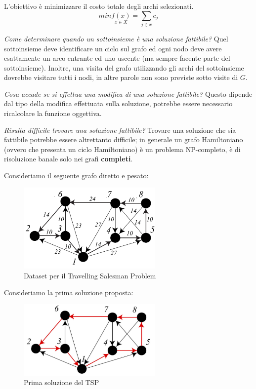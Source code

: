 \documentclass{article}
\begin{document}
L'obiettivo è minimizzare il costo totale degli archi selezionati.
$$min\underset{x\in X}{f(x)}=\sum_{j\in x}c_j$$

\textit{Come determinare quando un sottoinsieme è una soluzione fattibile?} Quel sottoinsieme deve identificare
un ciclo sul grafo ed ogni nodo deve avere esattamente un arco entrante ed uno uscente (ma sempre facente parte
del sottoinsieme). Inoltre, una visita del grafo utilizzando gli archi del sottoinsieme dovrebbe visitare tutti i
nodi, in altre parole non sono previste sotto visite di $G$.

\textit{Cosa accade se si effettua una modifica di una soluzione fattibile?} Questo dipende dal tipo della modifica
effettuata sulla soluzione, potrebbe essere necessario ricalcolare la funzione oggettiva.

\textit{Risulta difficile trovare una soluzione fattibile?} Trovare una soluzione che sia fattibile
potrebbe essere altrettanto difficile; in generale un grafo Hamiltoniano (ovvero che presenta un
ciclo Hamiltoniano) è un problema NP-completo, è di risoluzione banale solo nei grafi \textbf{completi}.

Consideriamo il seguente grafo diretto e pesato:
\begin{figure}[H]
    \centering
    \includegraphics[width=7cm]{images/TSP_dataset.png}
    \caption{Dataset per il Travelling Salesman Problem}
    \label{fig:tsp_dataset}
\end{figure}

Consideriamo la prima soluzione proposta:
\begin{figure}[H]
    \centering
    \includegraphics[width=7cm]{images/TSP_sol1.png}
    \caption{Prima soluzione del TSP}
    \label{fig:tsp_1_sol}
\end{figure}
\end{document}
